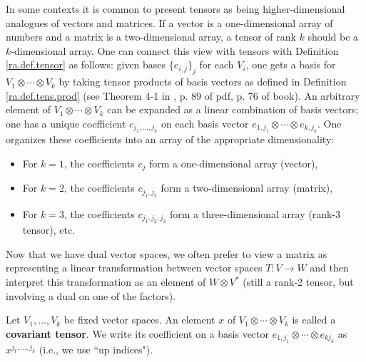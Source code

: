\begin{remark}

In some contexts it is common to present tensors as being higher-dimensional analogues of vectors and matrices. If a vector is a one-dimensional array of numbers and a matrix is a two-dimensional array, a tensor of rank \(k\) should be a \(k\)-dimensional array. One can connect this view with tensors with Definition \ref{ra.def.tensor} as follows: given bases \(\{e_{i,j}\}_j\) for each \(V_i\), one gets a basis for \(V_1 \otimes \cdots \otimes V_k\) by taking tensor products of basis vectors as defined in Definition \ref{ra.def.tens.prod} (see Theorem 4-1 in \citet{spivak1971calculus}, p. 89 of pdf, p. 76 of book). An arbitrary element of \(V_1 \otimes \cdots \otimes V_k\) can be expanded as a linear combination of basis vectors; one has a unique coefficient \(c_{j_1, \ldots, j_k}\) on each basis vector \(e_{1, j_1} \otimes \cdots \otimes e_{k, j_k}\). One organizes these coefficients into an array of the appropriate dimensionality:

\begin{itemize}

\item For \(k=1\), the coefficients \(c_j\) form a one-dimensional array (vector),

\item For \(k=2\), the coefficients \(c_{j_1, j_2}\) form a two-dimensional array (matrix),

\item For \(k=3\), the coefficients \(c_{j_1, j_2, j_3}\) form a three-dimensional array (rank-3 tensor), etc.

\end{itemize}

Now that we have dual vector spaces, we often prefer to view a matrix as representing a linear transformation between vector spaces \(T: V \to W\) and then interpret this transformation as an element of \(W \otimes V^*\) (still a rank-2 tensor, but involving a dual on one of the factors).

\end{remark}

\begin{definition}

Let \(V_1, \ldots, V_k\) be fixed vector spaces. An element \(x\) of \(V_1 \otimes \cdots \otimes V_k\) is called a \textbf{covariant tensor}. We write its coefficient on a basis vector \(e_{1, j_1} \otimes \cdots \otimes e_{k j_k}\) as \(x^{j_1 ,\ldots, j_k}\) (i.e., we use ``up indices").

\end{definition}

